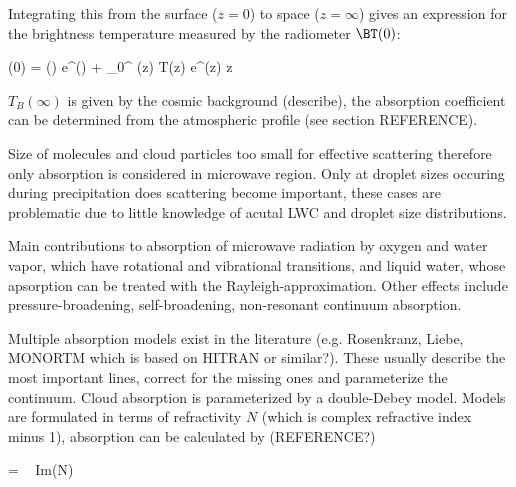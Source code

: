     Integrating this from the surface ($z = 0$) to space ($z = \infty$)
    gives an expression for the brightness temperature measured by the
    radiometer $\BT(0)$:

    \startformula
        \BT(0) = \BT(\infty) e^{\OD(\infty)} + 
            \int_{0}^{\infty} \ABSCOEF(z) T(z) e^{\OD(z)} \diff z \EQSTOP
    \stopformula

    $T_B(\infty)$ is given by the cosmic background (describe), the
    absorption coefficient can be determined from the atmospheric profile
    (see section REFERENCE).

\stopsection


\startsection[title=Atmospheric Extinction]

        {\externalfigure[absorption][width=\textwidth]}

    Size of molecules and cloud particles too small for effective scattering
    therefore only absorption is considered in microwave region. Only at
    droplet sizes occuring during precipitation does scattering become
    important, these cases are problematic due to little knowledge of acutal
    LWC and droplet size distributions.

    Main contributions to absorption of microwave radiation by oxygen and water
    vapor, which have rotational and vibrational transitions, and liquid
    water, whose apsorption can be treated with the Rayleigh-approximation.
    Other effects include pressure-broadening, self-broadening, non-resonant
    continuum absorption.

    Multiple absorption models exist in the literature (e.g. Rosenkranz, Liebe,
    MONORTM which is based on HITRAN or similar?). These usually describe
    the most important lines, correct for the missing ones and parameterize
    the continuum. Cloud absorption is parameterized by a double-Debey model.
    Models are formulated in terms of refractivity $N$ (which is complex
    refractive index minus 1), absorption can be calculated by (REFERENCE?)

    \startformula
        \ABSCOEF = ~ {\rm Im}(N) \EQCOMMA
    \stopformula

